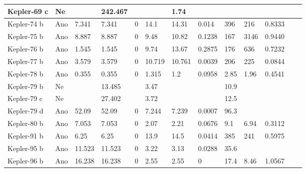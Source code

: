 \documentclass[a4paper,12pt]{article}
\begin{document}
{{{{{{{{{{{{{\begin{table}[!ht]
\begin{tabularx}{\textwidth}{|p{60pt}|X|X|X|X|X|X|X|X|X|X|X|X|}
		\hline	
		Kepler-69 c & \cellcolor{lightred} Ne & & 242.467 & & & 1.74 & & & & \\	
		\hline	
		Kepler-74 b & \cellcolor{lightgreen} Ano & 7.341 & 7.341 & \cellcolor{lightgreen} 0 & 14.1 & 14.31 & \cellcolor{lightgreen} 0.014 & 396 & 216 & \cellcolor{lightred} 0.8333 \\	
		\hline	
		Kepler-75 b & \cellcolor{lightgreen} Ano & 8.887 & 8.887 & \cellcolor{lightgreen} 0 & 9.48 & 10.82 & \cellcolor{lightorange} 0.1238 & 167 & 3146 & \cellcolor{lightred} 0.9440 \\	
		\hline	
		Kepler-76 b & \cellcolor{lightgreen} Ano & 1.545 & 1.545 & \cellcolor{lightgreen} 0 & 9.74 & 13.67 & \cellcolor{lightorange} 0.2875 & 176 & 636 & \cellcolor{lightred} 0.7232 \\	
		\hline	
		Kepler-77 b & \cellcolor{lightgreen} Ano & 3.579 & 3.579 & \cellcolor{lightgreen} 0 & 10.719 & 10.761 & \cellcolor{lightgreen} 0.0039 & 206 & 225 & \cellcolor{lightgreen} 0.0844 \\	
		\hline	
		Kepler-78 b & \cellcolor{lightgreen} Ano & 0.355 & 0.355 & \cellcolor{lightgreen} 0 & 1.315 & 1.2 & \cellcolor{lightgreen} 0.0958 & 2.85 & 1.96 & \cellcolor{lightorange} 0.4541 \\	
		\hline	
		Kepler-79 b & \cellcolor{lightred} Ne & & 13.485 & & 3.47 & & & 10.9 & & \\	
		\hline	
		Kepler-79 c & \cellcolor{lightred} Ne & & 27.402 & & 3.72 & & & 12.5 & & \\	
		\hline	
		Kepler-79 d & \cellcolor{lightgreen} Ano & 52.09 & 52.09 & \cellcolor{lightgreen} 0 & 7.244 & 7.239 & \cellcolor{lightgreen} 0.0007 & 96.3 & & \\	
		\hline	
		Kepler-80 b & \cellcolor{lightgreen} Ano & 7.053 & 7.053 & \cellcolor{lightgreen} 0 & 2.07 & 2.21 & \cellcolor{lightgreen} 0.0676 & 9.1 & 6.94 & \cellcolor{lightorange} 0.3112 \\	
		\hline
		Kepler-91 b & \cellcolor{lightgreen} Ano & 6.25 & 6.25 & \cellcolor{lightgreen} 0 & 13.9 & 14.5 & \cellcolor{lightgreen} 0.0414 & 385 & 241 & \cellcolor{lightred} 0.5975 \\	
		\hline
		Kepler-95 b & \cellcolor{lightgreen} Ano & 11.523 & 11.523 & \cellcolor{lightgreen} 0 & 3.22 & 3.13 & \cellcolor{lightgreen} 0.0288 & 35.6 & & \\	
		\hline		
		Kepler-96 b & \cellcolor{lightgreen} Ano & 16.238 & 16.238 & \cellcolor{lightgreen} 0 & 2.55 & 2.55 & \cellcolor{lightgreen} 0 & 17.4 & 8.46 & \cellcolor{lightred} 1.0567 \\	

\end{tabularx}
\end{table}}}}}}}}}}}}}}
\end{document}
